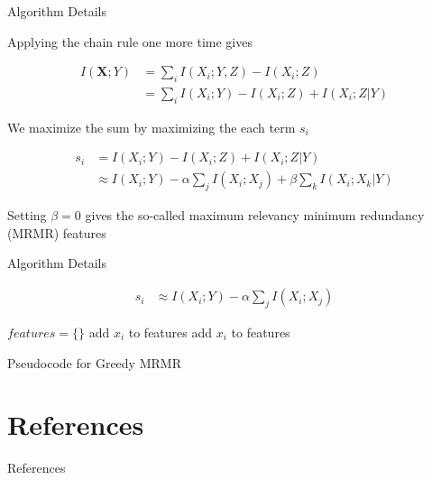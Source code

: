 \documentclass{beamer}					%
\begin{document}
\begin{frame}{Algorithm Details}

Applying the chain rule one more time gives

\begin{align*}
I(\bm{X};Y) &= \sum_{i}I(X_{i};Y,Z) - I(X_{i};Z)\\
&= \sum_{i}I(X_{i};Y)- I(X_{i};Z) + I(X_{i};Z|Y)
\end{align*} 


We maximize the sum by maximizing the each term $s_{i}$

\begin{align*}
s_{i} &= I(X_{i};Y)- I(X_{i};Z) + I(X_{i};Z|Y)\\
&\approx I(X_{i};Y)- \alpha\sum_{j}I(X_{i};X_{j}) + \beta\sum_{k}I(X_{i};X_{k}|Y)
\end{align*}

Setting $\beta=0$ gives the so-called maximum relevancy minimum redundancy (MRMR) features

\end{frame}

\begin{frame}{Algorithm Details}

\begin{align*}
s_{i} &\approx I(X_{i};Y)- \alpha\sum_{j}I(X_{i};X_{j}) 
\end{align*}

\begin{algorithm}[H]
\begin{algorithmic}[1]
\STATE $features = \{\}$
    \STATE add $x_{i}$ to features
  \ELSE
    \STATE add $x_{i}$ to features
  \ENDIF
  \ENDIF
\ENDFOR
\end{algorithmic}
\caption{Pseudocode for Greedy MRMR}
\label{alg:seq}
\end{algorithm}

\end{frame}



\section{References}

\begin{frame}[allowframebreaks]{References}
	\tiny
	
\end{frame}
\end{document}
